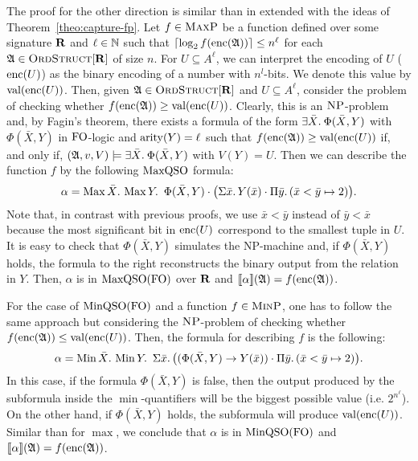 The proof for the other direction is similar than in \cite{kolaitis1994logical} extended with the ideas of Theorem~\ref{theo:capture-fp}. Let $f\in \text{\sc MaxP}$ be a function defined over some signature $\mathbf{R}$ and
$\ell\in\mathbb{N}$ such that $\lceil\log_2 f({\rm enc}(\mathfrak{A})) \rceil \leq n^\ell$ for each $\mathfrak{A}\in\text{\sc OrdStruct}[\mathbf{R}]$ of size $n$.
For $U \subseteq A^{\ell}$, we can interpret the encoding of $U$ (${\rm enc}(U)$) as the binary encoding of a number with $n^l$-bits. We denote this value by $\text{\rm val}({\rm enc}(U))$.
Then, given $\mathfrak{A}\in\text{\sc OrdStruct}[\mathbf{R}]$ and $U \subseteq A^{\ell}$, consider the problem of checking whether $f({\rm enc}(\mathfrak{A})) \geq \text{\rm val}({\rm enc}(U))$. 
Clearly, this is an $\text{\sc NP}$-problem and, by Fagin's theorem, there exists a formula of the form $\exists{\bar{X}}.\: \Phi(\bar{X}, Y)$ with $\Phi(\bar{X}, Y)$ in ${\rm FO}$-logic and ${\rm arity}(Y) = \ell$ such that $f({\rm enc}(\mathfrak{A})) \geq \text{\rm val}({\rm enc}(U))$ if, and only if, $(\mathfrak{A},v,V) \models \exists{\bar{X}}.\: \Phi(\bar{X}, Y)$ with $V(Y) = U$. 
Then we can describe the function $f$ by the following ${\rm MaxQSO}$ formula:
$$
\alpha = \maxa{\bar{X}} \maxa{Y} \ \Phi(\bar{X}, Y) \cdot \big( \sa{\bar{x}} Y(\bar{x}) \cdot \pa{\bar{y}}(\bar{x} < \bar{y} \mapsto 2) \big).
$$
Note that, in contrast with previous proofs, we use $\bar{x} < \bar{y}$ instead of $\bar{y} < \bar{x}$ because the most significant bit in ${\rm enc}(U)$ correspond to the smallest tuple in $U$.  
It is easy to check that $\Phi(\bar{X}, Y)$ simulates the NP-machine and, if $\Phi(\bar{X}, Y)$ holds, the formula to the right  reconstructs the binary output from the relation in $Y$.
Then, $\alpha$ is in ${\rm MaxQSO}({\rm FO})$ over $\mathbf{R}$ and ${\llbracket{}{\alpha}\rrbracket}(\mathfrak{A}) = f({\rm enc}(\mathfrak{A}))$. 

For the case of ${\rm MinQSO}({\rm FO})$ and a function $f \in \text{\sc MinP}$, one has to follow the same approach but considering the $\text{\sc NP}$-problem of checking whether $f({\rm enc}(\mathfrak{A})) \leq \text{\rm val}({\rm enc}(U))$. Then, the formula for describing $f$ is the following:
$$
\alpha = \operatorname{Min}{\bar{X}}.\, \operatorname{Min}{Y}.\, \ \Sigma{\bar{x}}.\, \big( (\Phi(\bar{X}, Y) \rightarrow Y(\bar{x})) \cdot \Pi{\bar{y}}.\,(\bar{x} < \bar{y} \mapsto 2)  \big).
$$
In this case, if the formula $\Phi(\bar{X}, Y)$ is false, then the output produced by the subformula inside the $\min$-quantifiers will be the biggest possible value (i.e. $2^{n^\ell}$).
On the other hand, if $\Phi(\bar{X}, Y)$ holds, the subformula will produce $\text{\rm val}({\rm enc}(U))$. 
Similar than for $\max$, we conclude that $\alpha$ is in ${\rm MinQSO}({\rm FO})$ and ${\llbracket{}{\alpha}\rrbracket}(\mathfrak{A}) = f({\rm enc}(\mathfrak{A}))$.